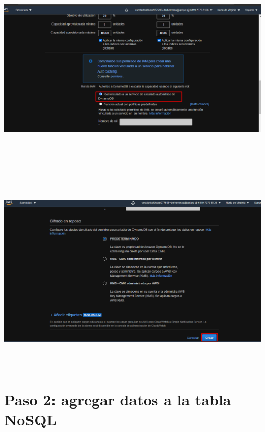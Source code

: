 \documentclass[12pt,letterpaper]{article}
\begin{document}
\begin{center}
    \includegraphics[width=18cm, height=10cm]{img/f.png}  
\end{center}
\begin{center}
    \includegraphics[width=18cm, height=10cm]{img/f.2.png}  
\end{center}
\newpage
\section{Paso 2: agregar datos a la tabla NoSQL
} 
\end{document}
